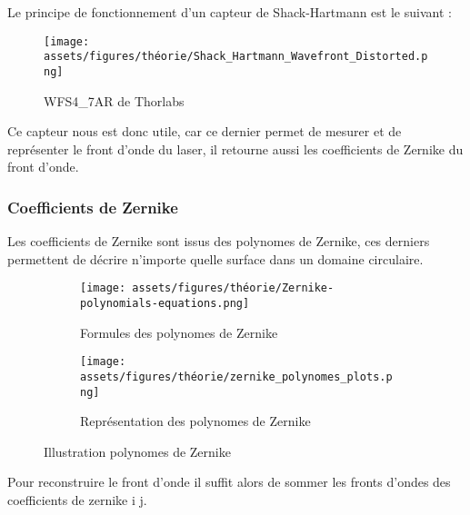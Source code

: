 \newpage
Le principe de fonctionnement d'un capteur de Shack-Hartmann est le suivant :

\begin{figure}[H]
  \centering
  \texttt{[image: assets/figures/théorie/Shack\_Hartmann\_Wavefront\_Distorted.png]}
  \caption[Image WFS Thorlabs]{WFS4\_7AR de Thorlabs\cite{WFS_thorlabs_site}\footnotemark}
  \label{fig:WFS_thorlabs}
\end{figure}

\footnotemark[5]

Ce capteur nous est donc utile, car ce dernier permet de mesurer et de représenter le front d'onde du laser, il retourne aussi les coefficients de
Zernike du front d'onde.


\subsubsection{Coefficients de Zernike}

Les coefficients de Zernike sont issus des polynomes de Zernike, ces derniers
permettent de décrire n'importe quelle surface dans un domaine circulaire.
\begin{figure}[H]
  \centering
  \begin{subfigure}{.5\textwidth}
    \centering
    \texttt{[image: assets/figures/théorie/Zernike-polynomials-equations.png]}
    \caption{Formules des polynomes de Zernike}
    \label{fig:formules_poly_Zernike}
  \end{subfigure}%
  \begin{subfigure}{.5\textwidth}
    \centering
    \texttt{[image: assets/figures/théorie/zernike\_polynomes\_plots.png]}
    \caption{Représentation des polynomes de Zernike}
    \label{fig:plots_des_polynomes_Zernike}
  \end{subfigure}
  \caption[Illustration polynomes de Zernike]{Illustration polynomes de Zernike \cite{Zernike_docteur_Damien}\footnotemark}
  \label{fig:illu_poly_Zernike}
\end{figure}


Pour reconstruire le front d'onde il suffit alors de sommer les fronts d'ondes des coefficients de zernike i j.